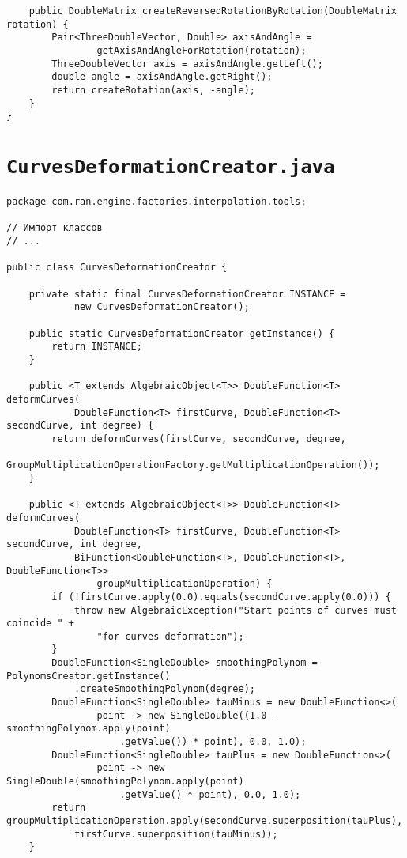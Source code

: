 \begin{verbatim}
    public DoubleMatrix createReversedRotationByRotation(DoubleMatrix rotation) {
        Pair<ThreeDoubleVector, Double> axisAndAngle =
                getAxisAndAngleForRotation(rotation);
        ThreeDoubleVector axis = axisAndAngle.getLeft();
        double angle = axisAndAngle.getRight();
        return createRotation(axis, -angle);
    }
}
\end{verbatim}

\section*{\texttt{CurvesDeformationCreator.java}}
\begin{verbatim}
package com.ran.engine.factories.interpolation.tools;

// Импорт классов
// ...

public class CurvesDeformationCreator {

    private static final CurvesDeformationCreator INSTANCE =
            new CurvesDeformationCreator();

    public static CurvesDeformationCreator getInstance() {
        return INSTANCE;
    }

    public <T extends AlgebraicObject<T>> DoubleFunction<T> deformCurves(
            DoubleFunction<T> firstCurve, DoubleFunction<T> secondCurve, int degree) {
        return deformCurves(firstCurve, secondCurve, degree,
                GroupMultiplicationOperationFactory.getMultiplicationOperation());
    }

    public <T extends AlgebraicObject<T>> DoubleFunction<T> deformCurves(
            DoubleFunction<T> firstCurve, DoubleFunction<T> secondCurve, int degree,
            BiFunction<DoubleFunction<T>, DoubleFunction<T>, DoubleFunction<T>>
                groupMultiplicationOperation) {
        if (!firstCurve.apply(0.0).equals(secondCurve.apply(0.0))) {
            throw new AlgebraicException("Start points of curves must coincide " +
                "for curves deformation");
        }
        DoubleFunction<SingleDouble> smoothingPolynom = PolynomsCreator.getInstance()
            .createSmoothingPolynom(degree);
        DoubleFunction<SingleDouble> tauMinus = new DoubleFunction<>(
                point -> new SingleDouble((1.0 - smoothingPolynom.apply(point)
                    .getValue()) * point), 0.0, 1.0);
        DoubleFunction<SingleDouble> tauPlus = new DoubleFunction<>(
                point -> new SingleDouble(smoothingPolynom.apply(point)
                    .getValue() * point), 0.0, 1.0);
        return groupMultiplicationOperation.apply(secondCurve.superposition(tauPlus),
            firstCurve.superposition(tauMinus));
    }


\end{verbatim}
